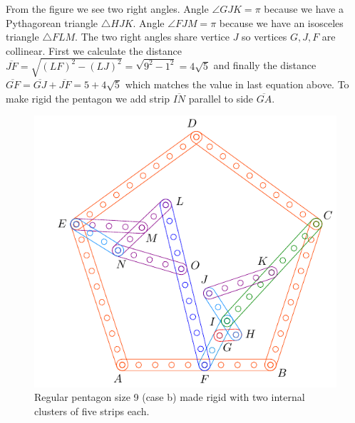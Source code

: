 \documentclass[11pt]{article}
\begin{document}
From the figure we see two right angles. Angle $\angle{GJK}=\pi$ because we have a Pythagorean triangle $\triangle{HJK}$. Angle $\angle{FJM}=\pi$ because we have an isosceles triangle $\triangle{FLM}$. The two right angles share vertice $J$ so vertices $G,J,F$ are collinear. First we calculate the distance $\overline{JF} = \sqrt{(LF)^2 - (LJ)^2} = \sqrt{9^2-1^2} = 4\sqrt5$ and finally the distance $\overline{GF} = \overline{GJ} + \overline{JF} = 5 + 4\sqrt5$ which matches the value in last equation above. To make rigid the pentagon we add strip $\overline{IN}$ parallel to side $\overline{GA}$.

\begin{figure}[H]
 \centering
 \includegraphics[scale=1]{9/penta9b}
 \caption{Regular pentagon size 9 (case b) made rigid with two internal clusters of five strips each.}
 \label{fig:penta9b}
\end{figure}
\end{document}
